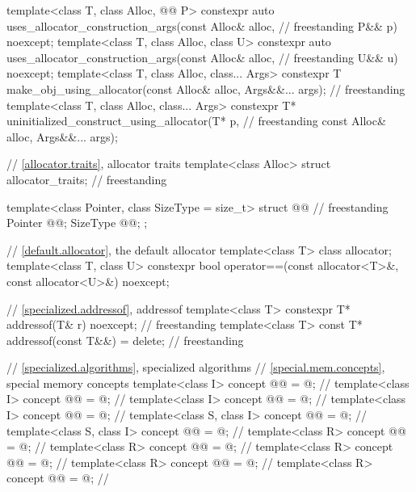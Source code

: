 \begin{codeblock}
{  template<class T, class Alloc, @@ P>
    constexpr auto uses_allocator_construction_args(const Alloc& alloc,             // freestanding
                                                    P&& p) noexcept;
  template<class T, class Alloc, class U>
    constexpr auto uses_allocator_construction_args(const Alloc& alloc,             // freestanding
                                                    U&& u) noexcept;
  template<class T, class Alloc, class... Args>
    constexpr T make_obj_using_allocator(const Alloc& alloc, Args&&... args);       // freestanding
  template<class T, class Alloc, class... Args>
    constexpr T* uninitialized_construct_using_allocator(T* p,                      // freestanding
                                                         const Alloc& alloc, Args&&... args);

  // \ref{allocator.traits}, allocator traits
  template<class Alloc> struct allocator_traits;                                    // freestanding

  template<class Pointer, class SizeType = size_t>
  struct @@ {                                                        // freestanding
    Pointer @@;
    SizeType @@;
  };

  // \ref{default.allocator}, the default allocator
  template<class T> class allocator;
  template<class T, class U>
    constexpr bool operator==(const allocator<T>&, const allocator<U>&) noexcept;

  // \ref{specialized.addressof}, addressof
  template<class T>
    constexpr T* addressof(T& r) noexcept;                                          // freestanding
  template<class T>
    const T* addressof(const T&&) = delete;                                         // freestanding

  // \ref{specialized.algorithms}, specialized algorithms
  // \ref{special.mem.concepts}, special memory concepts
  template<class I>
    concept @@ = @\seebelow@;                // \expos
  template<class I>
    concept @@ = @\seebelow@;              // \expos
  template<class I>
    concept @@ = @\seebelow@;        // \expos
  template<class I>
    concept @@ = @\seebelow@;        // \expos
  template<class S, class I>
    concept @@ = @\seebelow@;                  // \expos
  template<class S, class I>
    concept @@ = @\seebelow@;            // \expos
  template<class R>
    concept @@ = @\seebelow@;                   // \expos
  template<class R>
    concept @@ = @\seebelow@;                 // \expos
  template<class R>
    concept @@ = @\seebelow@;           // \expos
  template<class R>
    concept @@ = @\seebelow@;           // \expos
  template<class R>
    concept @@ = @\seebelow@;     // \expos

}
\end{codeblock}
